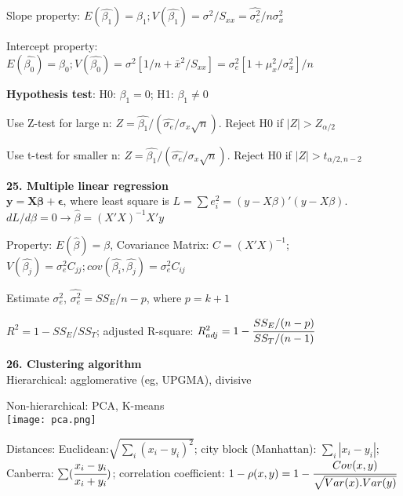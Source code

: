 \documentclass[a4paper,10pt,twocolumn]{article}
\begin{document}
Slope property: $E(\hat{\beta_1})=\beta_1; V(\hat{\beta_1})=\sigma^2/S_{xx}=\hat{\sigma_e^2}/n\sigma_x^2$

Intercept property: $E(\hat{\beta_0})=\beta_0; V(\hat{\beta_0})=\sigma^2[1/n+\bar{x}^2/S_{xx}]=\sigma_e^2[1+\mu_x^2/\sigma_x^2]/n$

\textbf{Hypothesis test}: H0: $\beta_1=0$; H1: $\beta_1\neq 0$

Use Z-test for large n: $Z=\hat{\beta_1}/(\hat{\sigma_e}/\sigma_x\sqrt{n})$. Reject H0 if $|Z|>Z_{\alpha/2}$

Use t-test for smaller n: $Z=\hat{\beta_1}/(\hat{\sigma_e}/\sigma_x\sqrt{n})$. Reject H0 if $|Z|>t_{\alpha/2,n-2}$
 
\textbf{25. Multiple linear regression}\\
$\mathbf{y=X\beta+\epsilon}$, where least square is $L=\sum e_i^2=(y-X\beta)'(y-X\beta)$. $dL/d\beta=0\rightarrow \hat{\beta}=(X'X)^{-1}X'y$

Property: $E(\hat{\beta})=\beta$, Covariance Matrix: $C=(X'X)^{-1}$; $V(\hat{\beta_j})=\sigma_e^2C_{jj}; cov(\hat{\beta_i},\hat{\beta_j})=\sigma_e^2C_{ij}$

Estimate $\sigma_e^2$, $\hat{\sigma_e^2}=SS_E/n-p$, where $p=k+1$

$R^2=1-SS_E/SS_T$; adjusted R-square: $R_{adj}^2=1-\cfrac{SS_E/(n-p)}{SS_T/(n-1)}$

\textbf{26. Clustering algorithm}\\
Hierarchical: agglomerative (eg, UPGMA), divisive

Non-hierarchical: PCA, K-means\\
\texttt{[image: pca.png]}

Distances: Euclidean:$\sqrt{\sum_i(x_i-y_i)^2}$; city block (Manhattan): $\sum_i|x_i-y_i|$; Canberra: $\sum(\cfrac{x_i-y_i}{x_i+y_i})$; correlation coefficient: $1-\rho(x,y)=1-\cfrac{Cov(x,y)}{\sqrt{Var(x).Var(y)}}$
\end{document}
